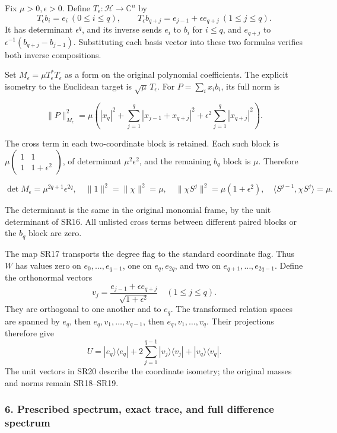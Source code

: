 Fix \(\mu>0,\epsilon>0\). Define \(T_\epsilon:\mathcal H\to\mathbb C^n\) by \[
T_\epsilon b_i=e_i\ (0\le i\le q),\qquad
T_\epsilon b_{q+j}=e_{j-1}+\epsilon e_{q+j}\ (1\le j\le q).
\tag{SR17}
\] It has determinant \(\epsilon^q\), and its inverse sends \(e_i\) to \(b_i\) for \(i\le q\), and \(e_{q+j}\) to \(\epsilon^{-1}(b_{q+j}-b_{j-1})\). Substituting each basis vector into these two formulas verifies both inverse compositions.

Set \(M_\epsilon=\mu T_\epsilon^*T_\epsilon\) as a form on the original polynomial coefficients. The explicit isometry to the Euclidean target is \(\sqrt\mu\,T_\epsilon\). For \(P=\sum_i x_ib_i\), its full norm is

\[
\|P\|_{M_\epsilon}^2
=\mu\left(
|x_q|^2+\sum_{j=1}^q|x_{j-1}+x_{q+j}|^2
+\epsilon^2\sum_{j=1}^q|x_{q+j}|^2\right).
\tag{SR18}
\]

The cross term in each two-coordinate block is retained. Each such block is \(\mu\begin{pmatrix}1&1\\1&1+\epsilon^2\end{pmatrix}\), of determinant \(\mu^2\epsilon^2\), and the remaining \(b_q\) block is \(\mu\). Therefore

\[
\det M_\epsilon=\mu^{2q+1}\epsilon^{2q},\quad
\|1\|^2=\|\chi\|^2=\mu,\quad
\|\chi S^j\|^2=\mu(1+\epsilon^2),\quad
\langle S^{j-1},\chi S^j\rangle=\mu.
\tag{SR19}
\]

The determinant is the same in the original monomial frame, by the unit determinant of SR16. All unlisted cross terms between different paired blocks or the \(b_q\) block are zero.

The map SR17 transports the degree flag to the standard coordinate flag. Thus \(W\) has values zero on \(e_0,\ldots,e_{q-1}\), one on \(e_q,e_{2q}\), and two on \(e_{q+1},\ldots,e_{2q-1}\). Define the orthonormal vectors \[
v_j=\frac{e_{j-1}+\epsilon e_{q+j}}{\sqrt{1+\epsilon^2}}
\quad(1\le j\le q).
\tag{SR20}
\] They are orthogonal to one another and to \(e_q\). The transformed relation spaces are spanned by \(e_q\), then \(e_q,v_1,\ldots,v_{q-1}\), then \(e_q,v_1,\ldots,v_q\). Their projections therefore give \[
U=|e_q\rangle\langle e_q|
+2\sum_{j=1}^{q-1}|v_j\rangle\langle v_j|
+|v_q\rangle\langle v_q|.
\tag{SR21}
\] The unit vectors in SR20 describe the coordinate isometry; the original masses and norms remain SR18--SR19.

\subsubsection{6. Prescribed spectrum, exact trace, and full difference spectrum}\label{endpoint-four_window_sharpness_review--prescribed-spectrum-exact-trace-and-full-difference-spectrum}

